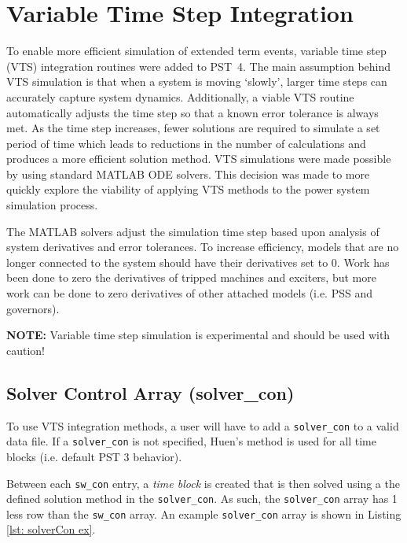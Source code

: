 \section{Variable Time Step Integration}  
To enable more efficient simulation of extended term events, variable time step (VTS) integration routines were added to \mbox{PST 4}.
The main assumption behind VTS simulation is that when a system is moving `slowly', larger time steps can accurately capture system dynamics.
Additionally, a viable VTS routine automatically adjusts the time step so that a known error tolerance is always met.
As the time step increases, fewer solutions are required to simulate a set period of time which leads to reductions in the number of calculations and produces a more efficient solution method.
VTS simulations were made possible by using standard MATLAB ODE solvers.
This decision was made to more quickly explore the viability of applying VTS methods to the power system simulation process.

The MATLAB solvers adjust the simulation time step based upon analysis of system derivatives and error tolerances.
To increase efficiency, models that are no longer connected to the system should have their derivatives set to $0$.
Work has been done to zero the derivatives of tripped machines and exciters, but more work can be done to zero derivatives of other attached models (i.e. PSS and governors).

\vspace{3 em}
\noindent \textbf{NOTE:} Variable time step simulation is experimental and should be used with caution!

\pagebreak
\subsection{Solver Control Array (solver\_con)}  
To use VTS integration methods, a user will have to add a \verb|solver_con| to a valid data file.
If a \verb|solver_con| is not specified, Huen's method is used for all time blocks (i.e. default PST 3 behavior).

Between each \verb|sw_con| entry, a \emph{time block} is created that is then solved using a the defined solution method in the \verb|solver_con|.
As such, the \verb|solver_con| array has 1 less row than the \verb|sw_con| array.
An example \verb|solver_con| array is shown in Listing \ref{lst: solverCon ex}.

